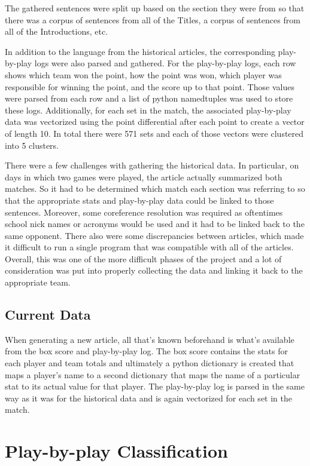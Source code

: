 \documentclass{article}
\begin{document}
The gathered sentences were split up based on the section they were from so that there was a corpus of sentences from all of the Titles, a corpus of sentences from all of the Introductions, etc. 

In addition to the language from the historical articles, the corresponding play-by-play logs were also parsed and gathered. For the play-by-play logs, each row shows which team won the point, how the point was won, which player was responsible for winning the point, and the score up to that point. Those values were parsed from each row and a list of python namedtuples was used to store these logs. Additionally, for each set in the match, the associated play-by-play data was vectorized using the point differential after each point to create a vector of length 10. In total there were 571 sets and each of those vectors were clustered into 5 clusters. 

There were a few challenges with gathering the historical data. In particular, on days in which two games were played, the article actually summarized both matches. So it had to be determined which match each section was referring to so that the appropriate stats and play-by-play data could be linked to those sentences. Moreover, some coreference resolution was required as oftentimes school nick names or acronyms would be used and it had to be linked back to the same opponent. There also were some discrepancies between articles, which made it difficult to run a single program that was compatible with all of the articles. Overall, this was one of the more difficult phases of the project and a lot of consideration was put into properly collecting the data and linking it back to the appropriate team.

\subsection{Current Data}
When generating a new article, all that's known beforehand is what's available from the box score and play-by-play log. The box score contains the stats for each player and team totals and ultimately a python dictionary is created that maps a player's name to a second dictionary that maps the name of a particular stat to its actual value for that player. The play-by-play log is parsed in the same way as it was for the historical data and is again vectorized for each set in the match. 

\section{Play-by-play Classification}
\end{document}
